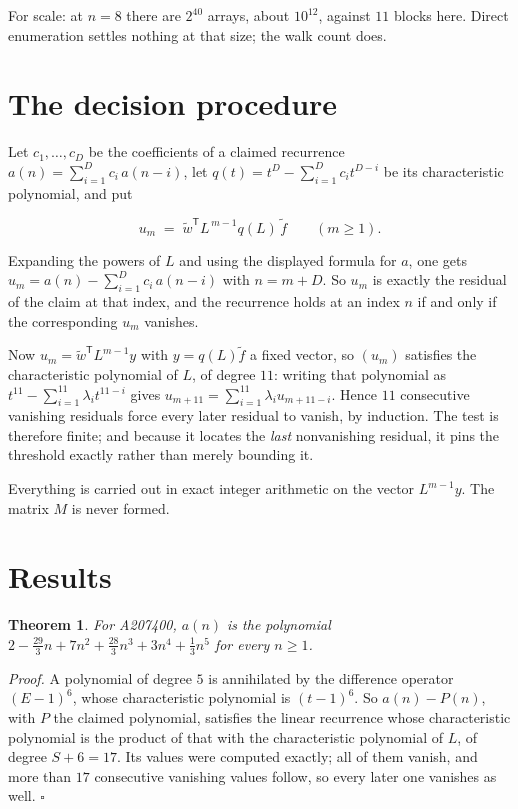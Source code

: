 \documentclass[11pt]{article}
\newtheorem{theorem}{Theorem}
\theoremstyle{definition}
\begin{document}
For scale: at $n = 8$ there are $2^{40}$ arrays, about $10^{12}$, against $11$ blocks here. Direct enumeration settles nothing at that size; the walk count does.

\section{The decision procedure}

Let $c_1,\dots,c_D$ be the coefficients of a claimed recurrence $a(n) = \sum_{i=1}^{D} c_i\,a(n-i)$, let $q(t) = t^{D} - \sum_{i=1}^{D} c_i t^{D-i}$ be its characteristic polynomial, and put

\[u_m \;=\; \tilde w^{\mathsf T} L^{\,m-1} q(L)\,\tilde f \qquad (m \ge 1).\]

Expanding the powers of $L$ and using the displayed formula for $a$, one gets $u_m = a(n) - \sum_{i=1}^{D} c_i\,a(n-i)$ with $n = m + D$. So $u_m$ is exactly the residual of the claim at that index, and the recurrence holds at an index $n$ if and only if the corresponding $u_m$ vanishes.

Now $u_m = \tilde w^{\mathsf T} L^{m-1} y$ with $y = q(L)\tilde f$ a fixed vector, so $(u_m)$ satisfies the characteristic polynomial of $L$, of degree $11$: writing that polynomial as $t^{11} - \sum_{i=1}^{11} \lambda_i t^{11-i}$ gives $u_{m+11} = \sum_{i=1}^{11} \lambda_i u_{m+11-i}$. Hence $11$ consecutive vanishing residuals force every later residual to vanish, by induction. The test is therefore finite; and because it locates the {\itshape last} nonvanishing residual, it pins the threshold exactly rather than merely bounding it.

Everything is carried out in exact integer arithmetic on the vector $L^{m-1}y$. The matrix $M$ is never formed.

\section{Results}

\begin{theorem} For A207400, $a(n)$ is the polynomial $2 - \frac{29}{3}n + 7n^{2} + \frac{28}{3}n^{3} + 3n^{4} + \frac{1}{3}n^{5}$ for every $n \ge 1$.\end{theorem}

{\itshape Proof.} A polynomial of degree $5$ is annihilated by the difference operator $(E-1)^{6}$, whose characteristic polynomial is $(t-1)^{6}$. So $a(n) - P(n)$, with $P$ the claimed polynomial, satisfies the linear recurrence whose characteristic polynomial is the product of that with the characteristic polynomial of $L$, of degree $S + 6 = 17$. Its values were computed exactly; all of them vanish, and more than $17$ consecutive vanishing values follow, so every later one vanishes as well. $\square$
\end{document}
